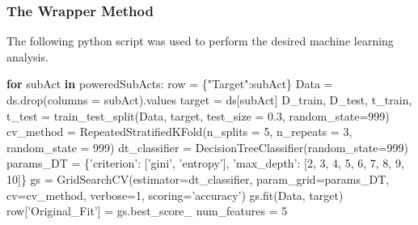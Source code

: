 \documentclass[11pt,]{article}
\newenvironment{Shaded}{\begin{snugshade}}{\end{snugshade}}
\newcommand{\ControlFlowTok}[1]{\textcolor[rgb]{0.12,0.11,0.11}{\textbf{#1}}}
\newcommand{\DecValTok}[1]{\textcolor[rgb]{0.69,0.50,0.00}{#1}}
\newcommand{\FloatTok}[1]{\textcolor[rgb]{0.69,0.50,0.00}{#1}}
\newcommand{\KeywordTok}[1]{\textcolor[rgb]{0.12,0.11,0.11}{\textbf{#1}}}
\newcommand{\NormalTok}[1]{\textcolor[rgb]{0.12,0.11,0.11}{#1}}
\newcommand{\OperatorTok}[1]{\textcolor[rgb]{0.12,0.11,0.11}{#1}}
\newcommand{\StringTok}[1]{\textcolor[rgb]{0.75,0.01,0.01}{#1}}
\begin{document}
\hypertarget{the-wrapper-method}{%
\subsubsection{The Wrapper Method}\label{the-wrapper-method}}

The following python script was used to perform the desired machine
learning analysis.

\begin{Shaded}
\begin{Highlighting}[]
\ControlFlowTok{for}\NormalTok{ subAct }\KeywordTok{in}\NormalTok{ poweredSubActs:}
\NormalTok{    row }\OperatorTok{=}\NormalTok{ \{}\StringTok{"Target"}\NormalTok{:subAct\}}
\NormalTok{    Data }\OperatorTok{=}\NormalTok{ ds.drop(columns }\OperatorTok{=}\NormalTok{ subAct).values}
\NormalTok{    target }\OperatorTok{=}\NormalTok{ ds[subAct]}
\NormalTok{    D_train, D_test, t_train, t_test }\OperatorTok{=}\NormalTok{ train_test_split(Data, target, test_size }\OperatorTok{=} \FloatTok{0.3}\NormalTok{, }
\NormalTok{                                        random_state}\OperatorTok{=}\DecValTok{999}\NormalTok{)}
\NormalTok{    cv_method }\OperatorTok{=}\NormalTok{ RepeatedStratifiedKFold(n_splits }\OperatorTok{=} \DecValTok{5}\NormalTok{, n_repeats }\OperatorTok{=} \DecValTok{3}\NormalTok{, random_state }\OperatorTok{=} \DecValTok{999}\NormalTok{)}
\NormalTok{    dt_classifier }\OperatorTok{=}\NormalTok{ DecisionTreeClassifier(random_state}\OperatorTok{=}\DecValTok{999}\NormalTok{)}
\NormalTok{    params_DT }\OperatorTok{=}\NormalTok{ \{}\StringTok{'criterion'}\NormalTok{: [}\StringTok{'gini'}\NormalTok{, }\StringTok{'entropy'}\NormalTok{], }
                \StringTok{'max_depth'}\NormalTok{: [}\DecValTok{2}\NormalTok{, }\DecValTok{3}\NormalTok{, }\DecValTok{4}\NormalTok{, }\DecValTok{5}\NormalTok{, }\DecValTok{6}\NormalTok{, }\DecValTok{7}\NormalTok{, }\DecValTok{8}\NormalTok{, }\DecValTok{9}\NormalTok{, }\DecValTok{10}\NormalTok{]\}}
\NormalTok{    gs }\OperatorTok{=}\NormalTok{ GridSearchCV(estimator}\OperatorTok{=}\NormalTok{dt_classifier, param_grid}\OperatorTok{=}\NormalTok{params_DT, cv}\OperatorTok{=}\NormalTok{cv_method,}
\NormalTok{                      verbose}\OperatorTok{=}\DecValTok{1}\NormalTok{, scoring}\OperatorTok{=}\StringTok{'accuracy'}\NormalTok{)}
\NormalTok{    gs.fit(Data, target)}
\NormalTok{    row[}\StringTok{'Original_Fit'}\NormalTok{] }\OperatorTok{=}\NormalTok{ gs.best_score_}
\NormalTok{    num_features }\OperatorTok{=} \DecValTok{5}
    

\end{Highlighting}
\end{Shaded}
\end{document}
